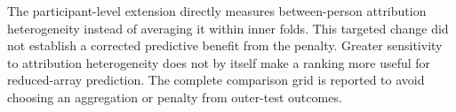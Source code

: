 The participant-level extension directly measures between-person attribution heterogeneity instead of averaging it within inner folds. This targeted change did not establish a corrected predictive benefit from the penalty. Greater sensitivity to attribution heterogeneity does not by itself make a ranking more useful for reduced-array prediction. The complete comparison grid is reported to avoid choosing an aggregation or penalty from outer-test outcomes.
